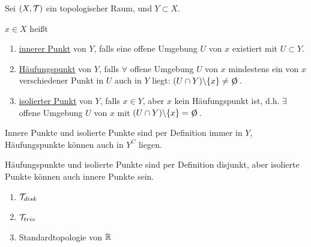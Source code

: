 \begin{definition}
    Sei $(X, \mathcal{T})$ ein topologischer Raum, und $Y \subset X$.
    
    $x \in X$ heißt
    \begin{enumerate}
        \item \underline{innerer Punkt} von $Y$, falls eine offene Umgebung $U$ von $x$ existiert mit $U \subset Y$.
        \item \underline{Häufungspunkt} von $Y$, falls $\forall$ offene Umgebung $U$ von $x$ mindestens ein von $x$ verschiedener Punkt in $U$ auch in $Y$ liegt: $(U \cap Y) \backslash \{x\} \neq \e$.
        \item \underline{isolierter Punkt} von $Y$, falls $x \in Y$, aber $x$ kein Häufungspunkt ist, d.h. $\exists$ offene Umgebung $U$ von $x$ mit $(U \cap Y) \backslash \{x\} = \e$.
    \end{enumerate}
\end{definition}

Innere Punkte und isolierte Punkte sind per Definition immer in $Y$, Häufungspunkte können auch in $Y^C$ liegen.

Häufungspunkte und isolierte Punkte sind per Definition disjunkt, aber isolierte Punkte können auch innere Punkte sein.

\begin{example}
    \begin{enumerate}
        \item $\mathcal{T}_{disk}$
        \item $\mathcal{T}_{triv}$
        \item Standardtopologie von $\mathbb{R}$
    \end{enumerate}    
\end{example}

